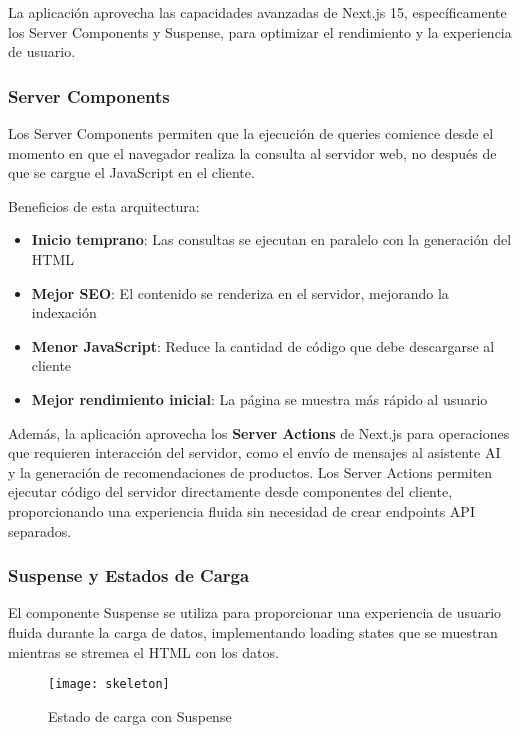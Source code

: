 La aplicación aprovecha las capacidades avanzadas de Next.js 15, específicamente los Server Components y Suspense, para optimizar el rendimiento y la experiencia de usuario.

\subsubsection{Server Components}

Los Server Components permiten que la ejecución de queries comience desde el momento en que el navegador realiza la consulta al servidor web, no después de que se cargue el JavaScript en el cliente.


Beneficios de esta arquitectura:
\begin{itemize}
    \item \textbf{Inicio temprano}: Las consultas se ejecutan en paralelo con la generación del HTML
    \item \textbf{Mejor SEO}: El contenido se renderiza en el servidor, mejorando la indexación
    \item \textbf{Menor JavaScript}: Reduce la cantidad de código que debe descargarse al cliente
    \item \textbf{Mejor rendimiento inicial}: La página se muestra más rápido al usuario
\end{itemize}

Además, la aplicación aprovecha los \textbf{Server Actions} de Next.js para operaciones que requieren interacción del servidor, como el envío de mensajes al asistente AI y la generación de recomendaciones de productos. Los Server Actions permiten ejecutar código del servidor directamente desde componentes del cliente, proporcionando una experiencia fluida sin necesidad de crear endpoints API separados.

\subsubsection{Suspense y Estados de Carga}

El componente Suspense se utiliza para proporcionar una experiencia de usuario fluida durante la carga de datos, implementando loading states que se muestran mientras se stremea el HTML con los datos.

\begin{figure}[H]
    \centering
    \texttt{[image: skeleton]}
    \caption{Estado de carga con Suspense}
\end{figure}


